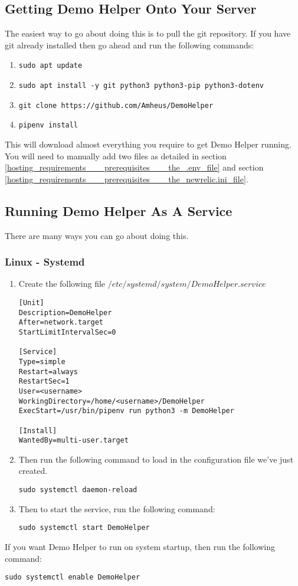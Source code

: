 \pagebreak
\subsection{Getting Demo Helper Onto Your Server}
The easiest way to go about doing this is to pull the git repository.
If you have git already installed then go ahead and run the following commands:
\begin{enumerate}
	\item{\texttt{sudo apt update}}
	\item{\texttt{sudo apt install -y git python3 python3-pip python3-dotenv}}
	\item{\texttt{git clone https://github.com/Amheus/DemoHelper}}
	\item{\texttt{pipenv install}}
\end{enumerate}

This will download almost everything you require to get Demo Helper running.
You will need to manually add two files as detailed in section \ref{hosting_requirements___prerequisites___the_.env_file} and section \ref{hosting_requirements___prerequisites___the_newrelic.ini_file}.


\pagebreak
\subsection{Running Demo Helper As A Service}
There are many ways you can go about doing this.
\subsubsection{Linux - Systemd}
\begin{enumerate}
	\item
	{
		Create the following file $/etc/systemd/system/DemoHelper.service$
		\begin{verbatim}
[Unit]
Description=DemoHelper
After=network.target
StartLimitIntervalSec=0

[Service]
Type=simple
Restart=always
RestartSec=1
User=<username>
WorkingDirectory=/home/<username>/DemoHelper
ExecStart=/usr/bin/pipenv run python3 -m DemoHelper

[Install]
WantedBy=multi-user.target
		\end{verbatim}
	}
	\item
	{
		Then run the following command to load in the configuration file we've just created.
		\begin{verbatim}
sudo systemctl daemon-reload
		\end{verbatim}
	}
	\item
	{
		Then to start the service, run the following command:
		\begin{verbatim}
sudo systemctl start DemoHelper
		\end{verbatim}
	}
\end{enumerate}
If you want Demo Helper to run on system startup, then run the following command:
\begin{verbatim}
sudo systemctl enable DemoHelper
\end{verbatim}

